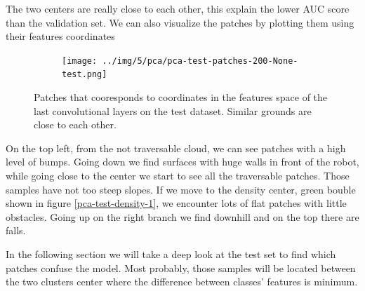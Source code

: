 \documentclass[../document.tex]{subfiles}
\begin{document}
The two centers are really close to each other, this explain the lower AUC score than the validation set. We can also visualize the patches by plotting them using their features coordinates
\begin{figure}[H]
    \centering
    \begin{subfigure}[b]{1\textwidth}
        \texttt{[image: ../img/5/pca/pca-test-patches-200-None-test.png]}
    \end{subfigure}
\caption{Patches that cooresponds to coordinates in the features space of the last convolutional layers on the test dataset. Similar grounds are close to each other.}
\end{figure}
On the top left, from the not traversable cloud, we can see patches with a high level of bumps. Going down we find surfaces with huge walls in front of the robot, while going close to the center we start to see all the traversable patches. Those samples have not too steep slopes. If we move to the density center, green bouble shown in figure \ref{pca-test-density-1}, we encounter lots of flat patches with little obstacles. Going up on the right branch we find downhill and on the top there are falls. 

In the following section we will take a deep look at the test set to find which patches confuse the model. Most probably, those samples will be located between the two clusters center where the difference between classes' features is minimum.
\end{document}
